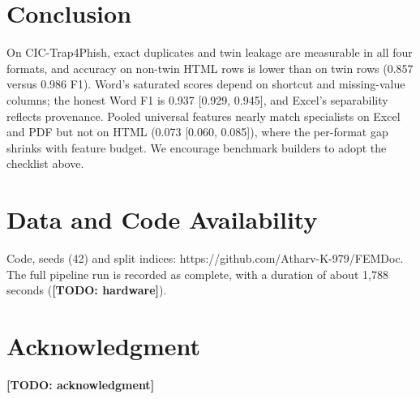 \documentclass[conference]{IEEEtran}
\newcommand{\todo}[1]{\textbf{[TODO: #1]}}
\begin{document}
\section{Conclusion}
On CIC-Trap4Phish, exact duplicates and twin leakage are measurable in all four formats, and accuracy on non-twin HTML rows is lower than on twin rows (0.857 versus 0.986 F1). Word's saturated scores depend on shortcut and missing-value columns; the honest Word F1 is 0.937 [0.929, 0.945], and Excel's separability reflects provenance. Pooled universal features nearly match specialists on Excel and PDF but not on HTML (0.073 [0.060, 0.085]), where the per-format gap shrinks with feature budget. We encourage benchmark builders to adopt the checklist above.

\section*{Data and Code Availability}
Code, seeds (42) and split indices: {https://github.com/Atharv-K-979/FEMDoc}. The full pipeline run is recorded as complete, with a duration of about 1,788 seconds (\todo{hardware}).

\section*{Acknowledgment}
\todo{acknowledgment}



\end{document}
